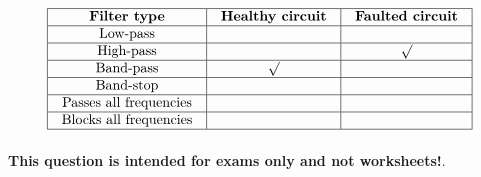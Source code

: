 $$\vbox{\offinterlineskip
\halign{\strut
\vrule \quad\hfil # \ \hfil & 
\vrule \quad\hfil # \ \hfil & 
\vrule \quad\hfil # \ \hfil \vrule \cr
\noalign{\hrule}
%
{\bf Filter type} & {\bf Healthy circuit} & {\bf Faulted circuit} \cr
%
\noalign{\hrule}
%
Low-pass &  &  \cr
%
\noalign{\hrule}
%
High-pass &  & $\surd$ \cr
%
\noalign{\hrule}
%
Band-pass & $\surd$ &  \cr
%
\noalign{\hrule}
%
Band-stop &  &  \cr
%
\noalign{\hrule}
%
Passes all frequencies &  &  \cr
%
\noalign{\hrule}
%
Blocks all frequencies &  &  \cr
%
\noalign{\hrule}
} %
}$$ %








{\bf This question is intended for exams only and not worksheets!}.



